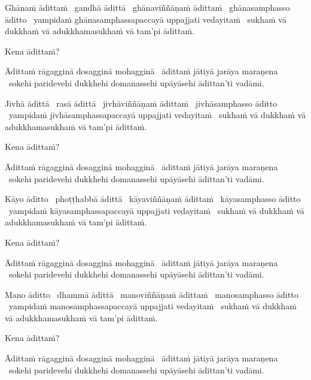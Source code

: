 \begin{pali-hang}
  Ghānaṁ ādittaṁ \breathmark\ gandhā ādittā \breathmark\ ghānaviññāṇaṁ ādittaṁ \breathmark\ ghānasamphasso āditto \breathmark\ yampidaṁ ghānasamphassapaccayā uppajjati vedayitaṁ \breathmark\ sukhaṁ vā dukkhaṁ vā adukkhamasukhaṁ vā tam'pi ādittaṁ.
\end{pali-hang}
\begin{pali-hangtogether}
Kena ādittaṁ?
\end{pali-hangtogether}
\begin{pali-hangtogether}
  Ādittaṁ rāgagginā dosagginā mohagginā \breathmark\ ādittaṁ jātiyā jarāya maraṇena \breathmark\ sokehi paridevehi dukkhehi domanassehi upāyāsehi ādittan'ti vadāmi.
\end{pali-hangtogether}

\begin{pali-hang}
  Jivhā ādittā \breathmark\ rasā ādittā \breathmark\ jivhāviññāṇaṁ ādittaṁ \breathmark\ jivhāsamphasso āditto \breathmark\ yampidaṁ jivhāsamphassapaccayā uppajjati vedayitaṁ \breathmark\ sukhaṁ vā dukkhaṁ vā adukkhamasukhaṁ vā tam'pi ādittaṁ.
\end{pali-hang}
\begin{pali-hangtogether}
Kena ādittaṁ?
\end{pali-hangtogether}
\begin{pali-hangtogether}
  Ādittaṁ rāgagginā dosagginā mohagginā \breathmark\ ādittaṁ jātiyā jarāya maraṇena \breathmark\ sokehi paridevehi dukkhehi domanassehi upāyāsehi ādittan'ti vadāmi.
\end{pali-hangtogether}

\begin{pali-hang}
  Kāyo āditto \breathmark\ phoṭṭhabbā ādittā \breathmark\ kāyaviññāṇaṁ ādittaṁ \breathmark\ kāyasamphasso āditto \breathmark\ yampidaṁ kāyasamphassapaccayā uppajjati vedayitaṁ \breathmark\ sukhaṁ vā dukkhaṁ vā adukkhamasukhaṁ vā tam'pi ādittaṁ.
\end{pali-hang}
\begin{pali-hangtogether}
Kena ādittaṁ?
\end{pali-hangtogether}
\begin{pali-hangtogether}
  Ādittaṁ rāgagginā dosagginā mohagginā \breathmark\ ādittaṁ jātiyā jarāya maraṇena \breathmark\ sokehi paridevehi dukkhehi domanassehi upāyāsehi ādittan'ti vadāmi.
\end{pali-hangtogether}

\begin{pali-hang}
  Mano āditto \breathmark\ dhammā ādittā \breathmark\ manoviññāṇaṁ ādittaṁ \breathmark\ manosamphasso āditto \breathmark\ yampidaṁ manosamphassapaccayā uppajjati vedayitaṁ \breathmark\ sukhaṁ vā dukkhaṁ vā adukkhamasukhaṁ vā tam'pi ādittaṁ.
\end{pali-hang}
\begin{pali-hangtogether}
Kena ādittaṁ?
\end{pali-hangtogether}
\begin{pali-hangtogether}
  Ādittaṁ rāgagginā dosagginā mohagginā \breathmark\ ādittaṁ jātiyā jarāya maraṇena \breathmark\ sokehi paridevehi dukkhehi domanassehi upāyāsehi ādittan'ti vadāmi.
\end{pali-hangtogether}

